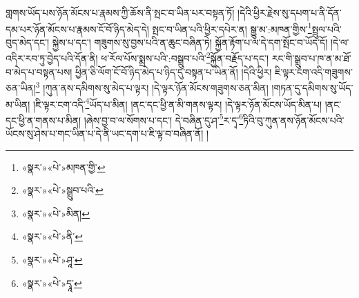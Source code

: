 གླགས་ཡོད་པས་ཉོན་མོངས་པ་རྣམས་ཀྱི་ཆོས་ནི་སྤང་བ་ཡིན་པར་བསྟན་ཏོ། །དེའི་ཕྱིར་རྗེས་སུ་དཔག་པ་ནི་དོན་དམ་པར་ཉོན་མོངས་པ་རྣམས་ངོ་བོ་ཉིད་མེད་དེ། སྤང་བ་ཡིན་པའི་ཕྱིར་དཔེར་ན། སྒྱུ་མ་:མཁན་གྱིས་\footnote{«སྣར་»«པེ་»མཁན་གྱི་}སྤྲུལ་པའི་བུད་མེད་དང་། སྐྱེས་པ་དང་། གཟུགས་སུ་བྱས་པའི་ན་ཆུང་བཞིན་ཏེ། སྐྱོན་རྟོག་པ་ལ་དེ་དག་སྤོང་བ་ཡོད་དོ། །དེ་ལ་འདིར་རབ་ཏུ་བྱེད་པའི་དོན་ནི། ཕ་རོལ་པོས་སྨྲས་པའི་:བསྒྲུབ་པའི་\footnote{«སྣར་»«པེ་»སྒྲུབ་པའི་}སྐྱོན་བརྗོད་པ་དང་། རང་གི་སྒྲུབ་པ་ཁ་ན་མ་ཐོ་བ་མེད་པ་བསྟན་པས། ཕྱིན་ཅི་ལོག་ངོ་བོ་ཉིད་མེད་པ་ཉིད་དུ་བསྟན་པ་ཡིན་ནོ། །དེའི་ཕྱིར། ཇི་ལྟར་ངག་འདི་གཟུགས་ཅན་ཡིན།\footnote{«སྣར་»«པེ་»མིན།} །ཀུན་ནས་དམིགས་སུ་མེད་པ་ལྟར། །དེ་ལྟར་ཉོན་མོངས་གཟུགས་ཅན་མིན། །གཏན་དུ་དམིགས་སུ་ཡོད་མ་ཡིན། །ཇི་ལྟར་ངག་འདི་\footnote{«སྣར་»«པེ་»ནི་}ཡོད་པ་མིན། །ནང་དང་ཕྱི་ན་མི་གནས་ལྟར། །དེ་ལྟར་ཉོན་མོངས་ཡོད་མིན་པ། །ནང་དང་ཕྱི་ན་གནས་པ་མིན། །ཞེས་བྱ་བ་ལ་སོགས་པ་དང་། དེ་བཞིན་དུ་ཤ་\footnote{«སྣར་»«པེ་»ཤཱ་}ར་དྭ་\footnote{«སྣར་»«པེ་»དྭཱ་}ཏིའི་བུ་ཀུན་ནས་ཉོན་མོངས་པའི་ཡོངས་སུ་ཤེས་པ་གང་ཡིན་པ་དེ་ནི་ཡང་དག་པ་ཇི་ལྟ་བ་བཞིན་ནོ། །
